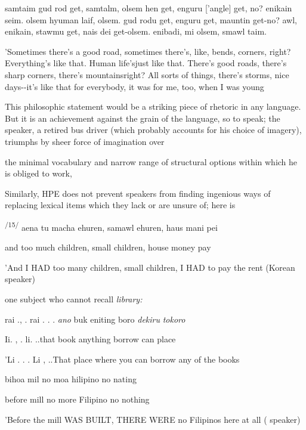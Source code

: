 \ea\label{ex:12}
 samtaim gud rod get, samtalm, olsem hen get, enguru ['angle] get, no? enikain seim. olsem hyuman laif, olsem. gud rodu get, enguru get, mauntin get-no? awl, enikain, stawmu get, nais dei get-olsem. enibadi, mi olsem, smawl taim.
\glt
\z

'Sometimes there's a good road, sometimes there's, like, bends, corners, right? Everything's like that. Human life'sjust like that. There's good roads, there's sharp corners, there's mountains\-right? All sorts of things, there's storms, nice days-{}-it's like that for everybody, it was for me, too, when I was young

This philosophic statement would be a striking piece of rhetoric in any language. But it is an achievement against the grain of the language, so to speak; the speaker, a retired bus driver (which probably accounts for his choice of imagery), triumphs by sheer force of imagination over


the minimal vocabulary and narrow range of structural options within which he is obliged to work,

Similarly, HPE does not prevent speakers from finding ingenious ways of replacing lexical items which they lack or are unsure of; here is


\textsuperscript{/15/} aena tu macha ehuren, samawl ehuren, haus mani pei

and too much children, small children, house money pay

'And I HAD too many children, small children, I HAD to pay the rent (Korean speaker)

one subject who cannot recall \textit{library:}

\ea\label{ex:13}
 rai ., . rai . . . \textit{ano} buk eniting boro \textit{dekiru} \textit{tokoro}
\glt
\z

Ii. , . li. ..that book anything borrow can place

'Li . . . Li , ..That place where you can borrow any of the books

\ea\label{ex:16}

\glt
\z

bihoa mil no moa hilipino no nating

before mill no more Filipino no nothing

'Before the mill WAS BUILT, THERE WERE no Filipinos here at all ( speaker)

